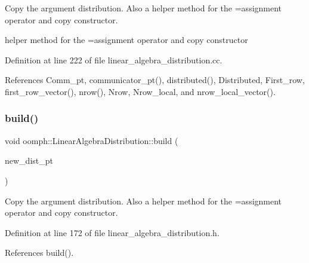 Copy the argument distribution. Also a helper method for the =assignment operator and copy constructor. 

helper method for the =assignment operator and copy constructor 

Definition at line 222 of file linear\+\_\+algebra\+\_\+distribution.\+cc.



References Comm\+\_\+pt, communicator\+\_\+pt(), distributed(), Distributed, First\+\_\+row, first\+\_\+row\+\_\+vector(), nrow(), Nrow, Nrow\+\_\+local, and nrow\+\_\+local\+\_\+vector().

\mbox{\label{classoomph_1_1LinearAlgebraDistribution_ae1ac321822ddea9a156dc46a1d3bad86}} 
\subsubsection{\texorpdfstring{build()}{build()}\hspace{0.1cm}{\footnotesize\ttfamily [4/4]}}
{\footnotesize\ttfamily void oomph\+::\+Linear\+Algebra\+Distribution\+::build (\begin{DoxyParamCaption}\item[{const \hyperlink{classoomph_1_1LinearAlgebraDistribution}{Linear\+Algebra\+Distribution} $\ast$}]{new\+\_\+dist\+\_\+pt }\end{DoxyParamCaption})\hspace{0.3cm}{\ttfamily [inline]}}



Copy the argument distribution. Also a helper method for the =assignment operator and copy constructor. 



Definition at line 172 of file linear\+\_\+algebra\+\_\+distribution.\+h.



References build().

\mbox{\label{classoomph_1_1LinearAlgebraDistribution_a92bfff97fd228b9c528922c39ab563b2}} 
